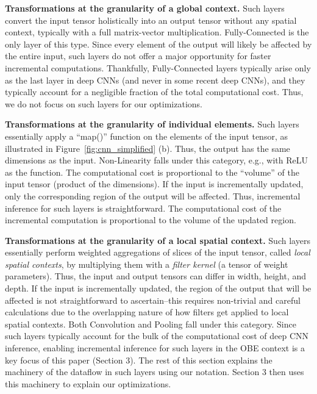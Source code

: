 \vspace{2mm}
\noindent \textbf{Transformations at the granularity of a global context.} 
Such layers convert the input tensor holistically into an output tensor without any spatial context, typically with a full matrix-vector multiplication.
Fully-Connected is the only layer of this type. Since every element of the output will likely be affected by the entire input, such layers do not offer a major opportunity for faster incremental computations. Thankfully, Fully-Connected layers typically arise only as the last layer in deep CNNs (and never in some recent deep CNNs), and they typically account for a negligible fraction of the total computational cost. Thus, we do not focus on such layers for our optimizations.

\vspace{2mm}
\noindent \textbf{Transformations at the granularity of individual elements.} 
Such layers essentially apply a ``map()'' function on the elements of the input tensor, as illustrated in Figure~\ref{fig:cnn_simplified} (b). 
Thus, the output has the same dimensions as the input. Non-Linearity falls under this category, e.g., with ReLU as the function. The computational cost is proportional to the ``volume'' of the input tensor (product of the dimensions). If the input is incrementally updated, only the corresponding region of the output will be affected. Thus, incremental inference for such layers is straightforward. The computational cost of the incremental computation is proportional to the volume of the updated region.

\vspace{2mm}
\noindent \textbf{Transformations at the granularity of a local spatial context.}
Such layers essentially perform weighted aggregations of slices of the input tensor, called \textit{local spatial contexts}, by multiplying them with a \textit{filter kernel} (a tensor of weight parameters). Thus, the input and output tensors can differ in width, height, and depth. If the input is incrementally updated, the region of the output that will be affected is not straightforward to ascertain--this requires non-trivial and careful calculations due to the overlapping nature of how filters get applied to local spatial contexts. Both Convolution and Pooling fall under this category. Since such layers typically account for the bulk of the computational cost of deep CNN inference, enabling incremental inference for such layers in the OBE context is a key focus of this paper (Section 3). The rest of this section explains the machinery of the dataflow in such layers using our notation. Section 3 then uses this machinery to explain our optimizations.

